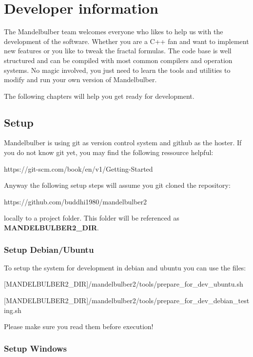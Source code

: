 \pagebreak

\section{Developer information}\label{developers}

The Mandelbulber team welcomes everyone who likes to help us with the development of the software.
Whether you are a C++ fan and want to implement new features or you like to tweak the fractal formulas.
The code base is well structured and can be compiled with most common compilers and operation systems.
No magic involved, you just need to learn the tools and utilities to modify and run your own version of Mandelbulber.

The following chapters will help you get ready for development.

\subsection{Setup}\label{developers-setup}

Mandelbulber is using git as version control system and github as the hoster.
If you do not know git yet, you may find the following ressource helpful: 

https://git-scm.com/book/en/v1/Getting-Started

Anyway the following setup steps will assume you git cloned the repository:

https://github.com/buddhi1980/mandelbulber2

locally to a project folder. This folder will be referenced as \textbf{MANDELBULBER2\_DIR}.

\subsubsection{Setup Debian/Ubuntu}\label{developers-setup-debian-and-ubuntu}

To setup the system for development in debian and ubuntu you can use the files: 

[MANDELBULBER2\_DIR]/mandelbulber2/tools/prepare\_for\_dev\_ubuntu.sh

[MANDELBULBER2\_DIR]/mandelbulber2/tools/prepare\_for\_dev\_debian\_testing.sh

Please make sure you read them before execution!

\subsubsection{Setup Windows}\label{developers-setup-windows}


